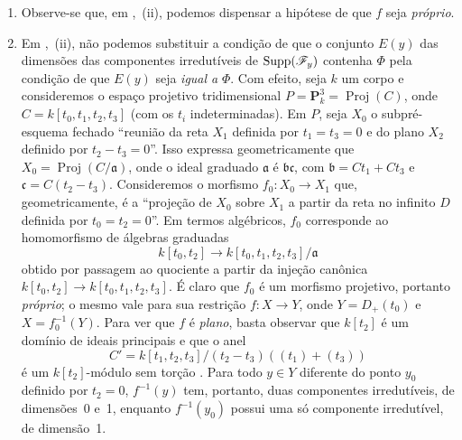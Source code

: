 \begin{remarks}[12.2.3]
\label{IV.12.2.3}
\begin{enumerate}[label=(\roman*)]
\item Observe-se que, em
,~(ii), podemos
dispensar a hipótese de que $f$
seja \emph{próprio}.

\item Em ,~(ii),
não podemos substituir a condição
de que o conjunto $E(y)$ das
dimensões das componentes
irredutíveis de
$\operatorname{Supp}(\mathscr{F}_y)$
contenha $\Phi$ pela condição de
que $E(y)$ seja \emph{igual a}
$\Phi$. Com efeito, seja $k$ um
corpo e consideremos o espaço
projetivo tridimensional
$P=\mathbf{P}^3_k=
\operatorname{Proj}(C)$, onde
$C=k[t_0,t_1,t_2,t_3]$ (com os
$t_i$ indeterminadas). Em $P$,
seja $X_0$ o subpré-esquema
fechado “reunião da reta $X_1$
definida por $t_1=t_3=0$ e do
plano $X_2$ definido por
$t_2-t_3=0$”. Isso expressa
geometricamente que
$X_0=\operatorname{Proj}
(C/\mathfrak a)$, onde o ideal
graduado $\mathfrak a$ é
$\mathfrak b\mathfrak c$, com
$\mathfrak b=Ct_1+Ct_3$ e
$\mathfrak c=C(t_2-t_3)$.
Consideremos o morfismo
$f_0:X_0\to X_1$ que,
geometricamente, é a “projeção
de $X_0$ sobre $X_1$ a partir
da reta no infinito $D$ definida
por $t_0=t_2=0$”. Em termos
algébricos, $f_0$ corresponde
ao homomorfismo de álgebras
graduadas
\[
k[t_0,t_2]\longrightarrow
k[t_0,t_1,t_2,t_3]/\mathfrak a
\]
obtido por passagem ao quociente
a partir da injeção canônica
$k[t_0,t_2]\to
k[t_0,t_1,t_2,t_3]$. É claro
que $f_0$ é um morfismo
projetivo, portanto
\emph{próprio}; o mesmo vale
para sua restrição $f:X\to Y$,
onde $Y=D_+(t_0)$ e
$X=f_0^{-1}(Y)$. Para ver que
$f$ é \emph{plano}, basta
observar que $k[t_2]$ é um
domínio de ideais principais
e que o anel
\[
C'=k[t_1,t_2,t_3]/
(t_2-t_3)((t_1)+(t_3))
\]
é um $k[t_2]$-módulo sem
torção .
Para todo $y\in Y$ diferente
do ponto $y_0$ definido por
$t_2=0$, $f^{-1}(y)$ tem,
portanto, duas componentes
irredutíveis, de dimensões~0
e~1, enquanto $f^{-1}(y_0)$
possui uma só componente
irredutível, de dimensão~1.


\end{enumerate}
\end{remarks}
